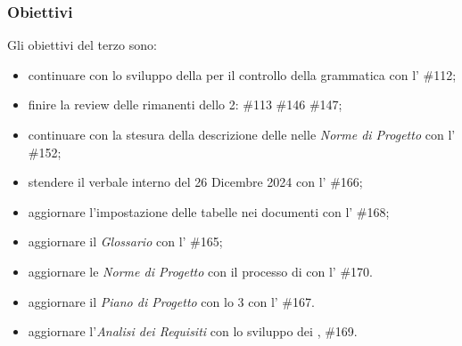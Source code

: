 \subsubsection{Obiettivi}
Gli obiettivi del terzo  sono:
\begin{itemize}
    \item continuare con lo sviluppo della  per il controllo della grammatica con l' \#112;
    \item finire la review delle  rimanenti dello  2: \#113 \#146 \#147;
    \item continuare con la stesura della descrizione delle  nelle \textit{Norme di Progetto} con l' \#152;
    \item stendere il verbale interno del 26 Dicembre 2024 con l' \#166;
    \item aggiornare l'impostazione delle tabelle nei documenti con l' \#168;
    \item aggiornare il \textit{Glossario} con l' \#165;
    \item aggiornare le \textit{Norme di Progetto} con il processo di  con l' \#170.
    \item aggiornare il \textit{Piano di Progetto} con lo  3 con l' \#167.
    \item aggiornare l'\textit{Analisi dei Requisiti} con lo sviluppo dei ,  \#169.
\end{itemize}